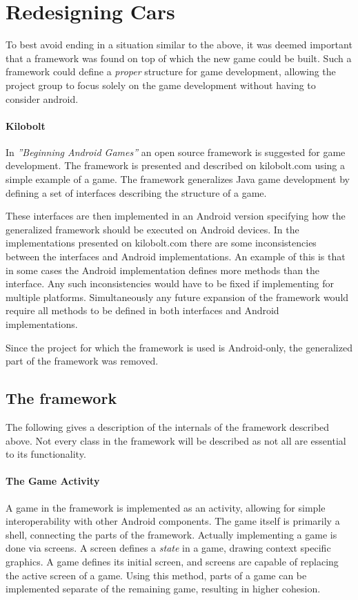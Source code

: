 \section{Redesigning Cars}\label{s1_redesign}
To best avoid ending in a situation similar to the above, it was deemed important that a framework was found on top of which the new game could be built.
Such a framework could define a \textit{proper} structure for game development, allowing the project group to focus solely on the game development without having to consider android.

\paragraph{Kilobolt}\label{kilobolt:description}
In \textit{''Beginning Android Games''}\cite{androidgames} an open source framework is suggested for game development.
The framework is presented and described on kilobolt.com\cite{kilobolt} using a simple example of a game.
The framework generalizes Java game development by defining a set of interfaces describing the structure of a game.

These interfaces are then implemented in an Android version specifying how the generalized framework should be executed on Android devices.
In the implementations presented on kilobolt.com there are some inconsistencies between the interfaces and Android implementations.
An example of this is that in some cases the Android implementation defines more methods than the interface.
Any such inconsistencies would have to be fixed if implementing for multiple platforms.
Simultaneously any future expansion of the framework would require all methods to be defined in both interfaces and Android implementations. 

Since the project for which the framework is used is Android-only, the generalized part of the framework was removed.

\subsection{The framework}
The following gives a description of the internals of the framework described above.
Not every class in the framework will be described as not all are essential to its functionality.
\paragraph{The Game Activity}
A game in the framework is implemented as an activity, allowing for simple interoperability with other Android components.
The game itself is primarily a shell, connecting the parts of the framework.
Actually implementing a game is done via screens.
A screen defines a \textit{state} in a game, drawing context specific graphics.
A game defines its initial screen, and screens are capable of replacing the active screen of a game.
Using this method, parts of a game can be implemented separate of the remaining game, resulting in higher cohesion.

